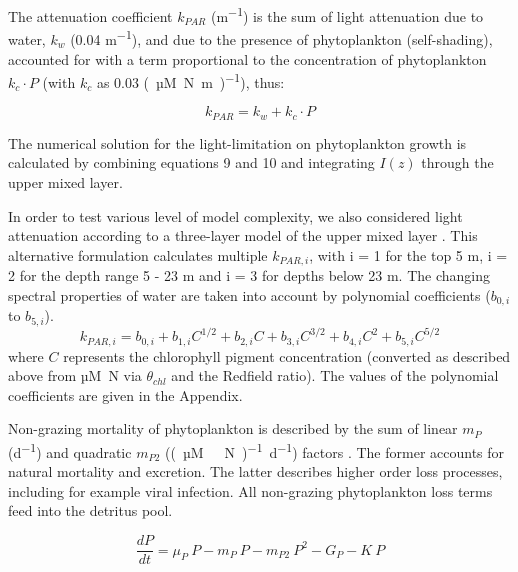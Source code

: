 \documentclass[journal abbreviation, manuscript]{copernicus}
\begin{document}
The attenuation coefficient $k_{PAR}$ (\unit{m^{-1}}) is the sum of light attenuation due to water, $k_w$ (0.04 \unit{m^{-1}}), and due to the presence of phytoplankton (self-shading), accounted for with a term proportional to the concentration of phytoplankton $k_c \cdot P$ (with $k_c$ as 0.03 \unit{(µM N m)^{-1}}), thus:

\begin{equation}
    k_{PAR} = k_w + k_c \cdot P
    \label{EQ:beerslaw}
\end{equation}

The numerical solution for the light-limitation on phytoplankton growth is calculated by combining equations 9 and 10 and integrating $I(z)$ through the upper mixed layer.

In order to test various level of model complexity, we also considered light attenuation according to a three-layer model of the upper mixed layer  \citep{Anderson1993APhotosynthesis}. This alternative formulation calculates multiple $k_{PAR, i}$, with i = 1 for the top 5 \unit{m}, i = 2 for the depth range 5 - 23 \unit{m} and i = 3 for depths below 23 \unit{m}. The changing spectral properties of water are taken into account by polynomial coefficients ($b_{0,i}$ to $b_{5,i}$).
\begin{equation}
    k_{PAR, i} = b_{0,i} + b_{1,i} C^{1/2} + b_{2,i} C + b_{3,i} C^{3/2} + b_{4,i} C^2 + b_{5,i} C^{5/2}
    \label{EQ:piecewiselight}
\end{equation}
where $C$ represents the chlorophyll pigment concentration (converted as described above from \unit{µM N} via $\theta_{chl}$ and the Redfield ratio). The values of the polynomial coefficients are given in the Appendix.

Non-grazing mortality of phytoplankton is described by the sum of linear $m_P$ (\unit{d^{-1}}) and quadratic $m_{P2}$ (\unit{(µM \ N)^{-1} d^{−1}}) factors \citep{Yool2011Medusa-1.0:Domain}. The former accounts for natural mortality and excretion. The latter describes higher order loss processes, including for example viral infection. All non-grazing phytoplankton loss terms feed into the detritus pool.

\begin{equation}
    \frac{d P}{d t} =
    \mu_{P} \ P  %
    - m_P \ P %
    - m_{P2} \ P^2 %
    - G_P %
    - K \ P %
\end{equation}
\end{document}
